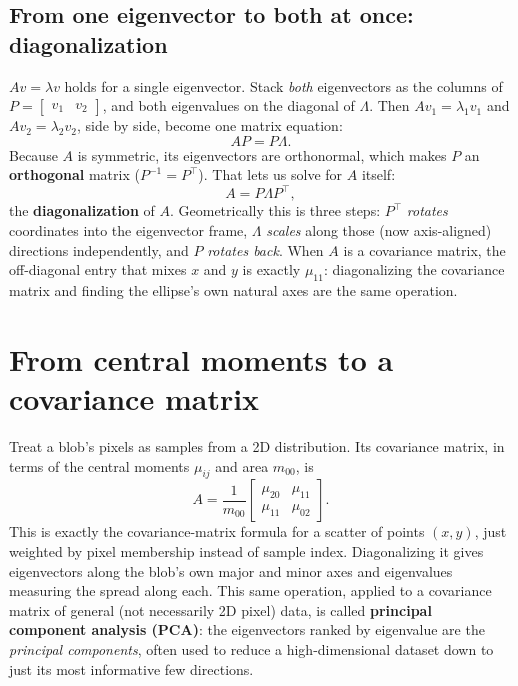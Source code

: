 \subsection*{From one eigenvector to both at once: diagonalization}

$Av=\lambda v$ holds for a single eigenvector. Stack \emph{both} eigenvectors as the columns of $P=\begin{bmatrix}v_1 & v_2\end{bmatrix}$, and both eigenvalues on the diagonal of $\Lambda$. Then $Av_1=\lambda_1 v_1$ and $Av_2=\lambda_2 v_2$, side by side, become one matrix equation:
\begin{equation}
AP = P\Lambda.
\end{equation}
Because $A$ is symmetric, its eigenvectors are orthonormal, which makes $P$ an \textbf{orthogonal} matrix ($P^{-1}=P^\top$). That lets us solve for $A$ itself:
\begin{equation}
A = P\Lambda P^\top,
\end{equation}
the \textbf{diagonalization} of $A$. Geometrically this is three steps: $P^\top$ \emph{rotates} coordinates into the eigenvector frame, $\Lambda$ \emph{scales} along those (now axis-aligned) directions independently, and $P$ \emph{rotates back}. When $A$ is a covariance matrix, the off-diagonal entry that mixes $x$ and $y$ is exactly $\mu_{11}$: diagonalizing the covariance matrix and finding the ellipse's own natural axes are the same operation.

\section{From central moments to a covariance matrix}

Treat a blob's pixels as samples from a 2D distribution. Its covariance matrix, in terms of the central moments $\mu_{ij}$ and area $m_{00}$, is
\begin{equation}
A = \frac{1}{m_{00}}\begin{bmatrix}\mu_{20} & \mu_{11} \\ \mu_{11} & \mu_{02}\end{bmatrix}.
\end{equation}
This is exactly the covariance-matrix formula for a scatter of points $(x,y)$, just weighted by pixel membership instead of sample index. Diagonalizing it gives eigenvectors along the blob's own major and minor axes and eigenvalues measuring the spread along each. This same operation, applied to a covariance matrix of general (not necessarily 2D pixel) data, is called \textbf{principal component analysis (PCA)}: the eigenvectors ranked by eigenvalue are the \emph{principal components}, often used to reduce a high-dimensional dataset down to just its most informative few directions.

